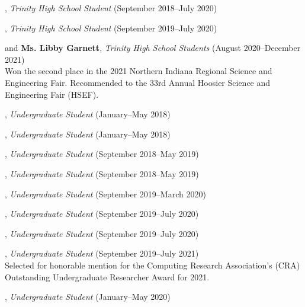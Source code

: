 \documentclass[10pt]{article}
\newenvironment{myindentpar}[1]%
{\begin{list}{}%
         {\setlength{\leftmargin}{#1}}%
         \item[]%
}
{\end{list}}
\newcounter{list}
\begin{document}
\begin{myindentpar}{0.75cm}

\hspace{-0.75cm}{\bf Eric Zhang}, \textit{Trinity High School Student} (September 2018--July 2020)

\hspace{-0.75cm}{\bf Michael Florin}, \textit{Trinity High School Student} (September 2019--July 2020)

\hspace{-0.75cm}{\bf Ms. Rebekah Fang} and {\bf Ms. Libby Garnett}, \textit{Trinity High School Students} (August 2020--December 2021) \\
	Won the second place in the 2021 Northern Indiana Regional Science and Engineering Fair. Recommended to the 33rd Annual Hoosier Science and Engineering Fair (HSEF).

\hspace{-0.75cm}{\bf Matthew Malir}, \textit{Undergraduate Student} (January--May 2018)
	
\hspace{-0.75cm}{\bf Sebastian Miner}, \textit{Undergraduate Student} (January--May 2018)

\hspace{-0.75cm}{\bf Matthew Schoenbauer}, \textit{Undergraduate Student} (September 2018--May 2019)
	
\hspace{-0.75cm}{\bf Ms. Yuhan (Tina) Wu}, \textit{Undergraduate Student} (September 2018--May 2019)

\hspace{-0.75cm}{\bf Chan Hee Song}, \textit{Undergraduate Student} (September 2019--March 2020)

\hspace{-0.75cm}{\bf Xiangyu Dong}, \textit{Undergraduate Student} (September 2019--July 2020)

\hspace{-0.75cm}{\bf Tianze Zheng}, \textit{Undergraduate Student} (September 2019--July 2020)

\hspace{-0.75cm}{\bf Bo Ni}, \textit{Undergraduate Student} (September 2019--July 2021) \\
	Selected for honorable mention for the Computing Research Association's (CRA) Outstanding Undergraduate Researcher Award for 2021.

\hspace{-0.75cm}{\bf Alvin Alaphat}, \textit{Undergraduate Student} (January--May 2020)


\end{myindentpar}
\end{document}
